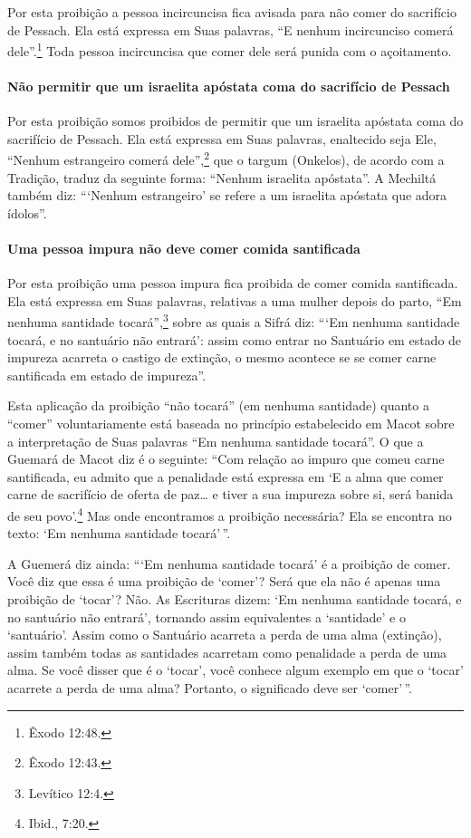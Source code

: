 \begin{multicols}{2}
Por esta proibição a pessoa incircuncisa fica avisada para não comer do
sacrifício de Pessach\starr. Ela está expressa em Suas palavras, ``E nenhum
incircunciso comerá dele''.\footnote{Êxodo 12:48.} Toda pessoa incircuncisa que
comer dele será punida com o açoitamento.

\paragraph{Não permitir que um israelita apóstata coma do sacrifício de Pessach\starr{}}

Por esta proibição somos proibidos de permitir que um israelita
apóstata coma do sacrifício de Pessach\starr. Ela está expressa em Suas
palavras, enaltecido seja Ele, ``Nenhum estrangeiro comerá dele'',\footnote{Êxodo 12:43.} que o targum\starr{}
(Onkelos\starr), de acordo com a Tradição, traduz da seguinte forma: ``Nenhum
israelita apóstata''. A Mechiltá\starr{} também diz: ```Nenhum estrangeiro' se
refere a um israelita apóstata que adora ídolos''.

\paragraph{Uma pessoa impura não deve comer comida santificada}

Por esta proibição uma pessoa impura fica proibida de comer comida
santificada. Ela está expressa em Suas palavras, relativas a uma mulher
depois do parto, ``Em nenhuma santidade tocará'',\footnote{Levítico 12:4.} sobre
as quais a Sifrá\starr{} diz: ```Em nenhuma santidade tocará, e no santuário não
entrará': assim como entrar no Santuário em estado de impureza acarreta
o castigo de extinção, o mesmo acontece se se comer carne santificada em
estado de impureza''.

Esta aplicação da proibição ``não tocará'' (em nenhuma santidade) quanto
a ``comer'' voluntariamente está baseada no princípio estabelecido em
Macot\starr{} sobre a interpretação de Suas palavras ``Em nenhuma santidade
tocará''. O que a Guemará\starr{} de Macot\starr{} diz é o seguinte: ``Com relação ao
impuro que comeu carne santificada, eu admito que a penalidade está
expressa em `E a alma que comer carne de sacrifício de oferta de paz\ldots{}
e tiver a sua impureza sobre si, será banida de seu povo'.\footnote{Ibid., 7:20.}
Mas onde encontramos a proibição necessária? Ela se encontra no texto:
`Em nenhuma santidade tocará'\,''.

A Guemerá diz ainda: ```Em nenhuma santidade tocará' é a proibição de
comer. Você diz que essa é uma proibição de `comer'? Será que ela não é
apenas uma proibição de `tocar'? Não. As Escrituras dizem: `Em nenhuma
santidade tocará, e no santuário não entrará', tornando assim
equivalentes a `santidade' e o `santuário'. Assim como o Santuário
acarreta a perda de uma alma (extinção), assim também todas as
santidades acarretam como penalidade a perda de uma alma. Se você disser
que é o `tocar', você conhece algum exemplo em que o `tocar' acarrete a
perda de uma alma? Portanto, o significado deve ser `comer'\,''.


\end{multicols}
